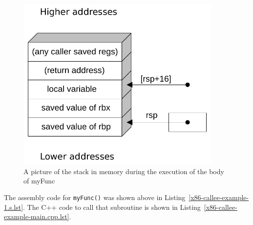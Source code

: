 \begin{figure}[h]
\centering
\includegraphics[width=4in]{x86-64bit/x86-activation-record.pdf}
\caption{A picture of the stack in memory during the execution of the body of myFunc}
\label{x86-activation-record.fig}
\end{figure}

The assembly code for {\tt myFunc()} was shown above in
Listing~\ref{x86-callee-example-1.s.lst}. The C++ code to call that
subroutine is shown in
Listing~\ref{x86-callee-example-main.cpp.lst}.

\begin{figure}[h!]

\end{figure}




